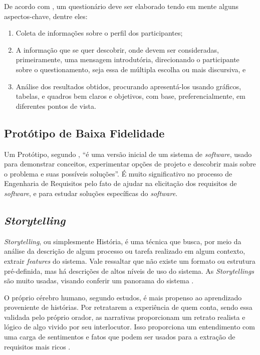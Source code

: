 De acordo com \cite{segundo2017custom}, um questionário deve ser elaborado tendo em mente alguns aspectos-chave, dentre eles: 

\begin{enumerate}
    \item Coleta de informações sobre o perfil dos participantes; 
    \item A informação que se quer descobrir, onde devem ser consideradas, primeiramente, uma mensagem  introdutória, direcionando o participante sobre o questionamento, seja essa de múltipla escolha ou mais discursiva, e
    \item Análise dos resultados obtidos, procurando apresentá-los usando gráficos, tabelas, e quadros bem claros e objetivos, com base, preferencialmente, em diferentes pontos de vista.
\end{enumerate}

\subsection{Protótipo de Baixa Fidelidade}

\label{sec:prototipo-def}

Um Protótipo, segundo \cite{Sommerville10}, “é uma versão inicial de um sistema de \textit{software}, usado para demonstrar conceitos, experimentar opções de projeto e descobrir mais sobre o problema e suas possíveis soluções”. É muito significativo no processo de Engenharia de Requisitos pelo fato de ajudar na elicitação dos requisitos de \textit{software}, e para estudar soluções específicas do \textit{software}.

\subsection{\textit{Storytelling}}

\label{sec:storytelling}

\textit{Storytelling}, ou simplesmente História, é uma técnica que busca, por meio da análise da descrição de algum processo ou tarefa realizado em algum contexto, extrair \textit{features} do sistema. Vale ressaltar que não existe um formato ou estrutura pré-definida, mas há descrições de altos níveis de uso do sistema. As \textit{Storytellings} são muito usadas, visando conferir um panorama do sistema  \cite{Sommerville10}.

O próprio cérebro humano, segundo estudos, é mais propenso ao aprendizado proveniente de histórias. Por retratarem a experiência de quem conta, sendo essa validada pelo próprio orador, as narrativas proporcionam um retrato realista e lógico de algo vivido por seu interlocutor. Isso proporciona um entendimento com uma carga de sentimentos e fatos que podem ser usados para a extração de requisitos mais ricos  \cite{storytelling}.


